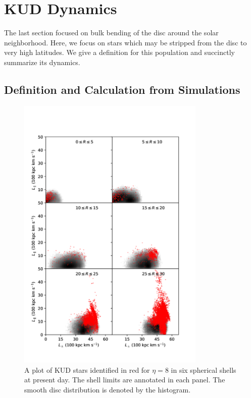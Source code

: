 \section{KUD Dynamics} \label{sec:kud}

The last section focused on bulk bending of the disc around the solar neighborhood. Here, we focus on stars which may be stripped from the disc to very high latitudes. We give a definition for this population and succinctly summarize its dynamics.





\subsection{Definition and Calculation from Simulations} \label{ssec:def}


\begin{figure}
    \centering
	\includegraphics[width=0.8\textwidth]{../figures/angmom_268824_eta_8.pdf}
	\caption{A plot of KUD stars identified in red for $\eta=8$ in six spherical shells at present day. The shell limits are annotated in each panel. The smooth disc distribution is denoted by the histogram.}
	\label{fig:angmom_eta}
\end{figure}





